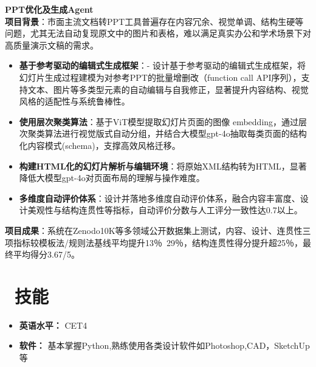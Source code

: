 \documentclass[11pt]{article}
\newlength{\interProjectSpacing}
\newcommand{\projectsep}{\vspace{\interProjectSpacing}}
\newlength{\intraProjectTitleSep}
\newcommand{\titlebreak}{\\[\intraProjectTitleSep]}
\newlength{\intraProjectListTopSep}
\begin{document}
\projectsep

\textbf{PPT优化及生成Agent} \hfill  \titlebreak
\textbf{项目背景}：市面主流文档转PPT工具普遍存在内容冗余、视觉单调、结构生硬等问题，尤其无法自动复现原文中的图片和表格，难以满足真实办公和学术场景下对高质量演示文稿的需求。
\begin{itemize}[nosep, topsep=\intraProjectListTopSep]
    \item \textbf{基于参考驱动的编辑式生成框架}：- 设计基于参考驱动的编辑式生成框架，将幻灯片生成过程建模为对参考PPT的批量增删改（function call API序列），支持文本、图片等多类型元素的自动编辑与自我修正，显著提升内容结构、视觉风格的适配性与系统鲁棒性。
    \item \textbf{使用层次聚类算法}：基于ViT模型提取幻灯片页面的图像 embedding，通过层次聚类算法进行视觉版式自动分组，并结合大模型gpt-4o抽取每类页面的结构化内容模式(schema)，支撑高效风格迁移。
    \item \textbf{构建HTML化的幻灯片解析与编辑环境}：将原始XML结构转为HTML，显著降低大模型gpt-4o对页面布局的理解与操作难度。
    \item \textbf{多维度自动评价体系}：设计并落地多维度自动评价体系，融合内容丰富度、设计美观性与结构连贯性等指标，自动评价分数与人工评分一致性达0.7以上。
\end{itemize}
\textbf{项目成果}：系统在Zenodo10K等多领域公开数据集上测试，内容、设计、连贯性三项指标较模板法/规则法基线平均提升13％~29％，结构连贯性得分提升超25％，最终平均得分3.67/5。

\projectsep


\section{\makebox[\widthof{\faCogs}][c]{\color{CVBlue}\faCogs}\ 技能}
\begin{itemize}[nosep]
    \item \textbf{英语水平：} CET4 
    \item \textbf{软件：} 基本掌握Python,熟练使用各类设计软件如Photoshop,CAD，SketchUp等
\end{itemize}
\end{document}
